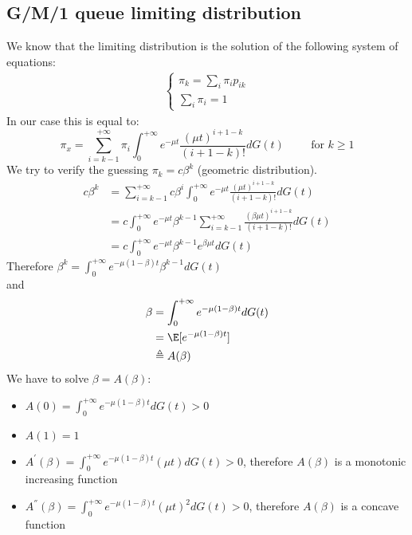 \subsection{G/M/1 queue limiting distribution}
We know that the limiting distribution is the solution of the following system of equations:
\begin{equation*}
 \begin{split}
	 \begin{cases}
		 \pi_k = \sum_i \pi_i p_{ik} \\
		 \sum_i \pi_i = 1
	 \end{cases}
 \end{split}
\end{equation*}
In our case this is equal to:
$$\pi_x = \sum_{i = k-1}^{+\infty} \pi_i \int_0^{+\infty}e^{-\mu t} \frac{(\mu t)^{i+1-k}}{(i+1-k)!}dG(t) \hspace{1cm} \text{for } k \geq 1$$
We try to verify the guessing $\pi_k=c\beta^k$ (geometric distribution).
\begin{equation*}
 \begin{split}
		 c\beta^k &= \sum_{i = k-1}^{+\infty} c\beta^i \int_0^{+\infty}e^{-\mu t} \frac{(\mu t)^{i+1-k}}{(i+1-k)!}dG(t) \\
		 &= c \int_0^{+\infty}e^{-\mu t}\beta^{k-1}\sum_{i = k-1}^{+\infty}\frac{(\beta \mu t)^{i+1-k}}{(i+1-k)!}dG(t) \\
		 &= c \int_0^{+\infty}e^{-\mu t}\beta^{k-1}e^{\beta \mu t}dG(t)
 \end{split}
\end{equation*}
Therefore $\beta^k = \int_0^{+\infty}e^{-\mu(1-\beta)t}\beta^{k-1}dG(t)$\\
and
\begin{equation*}
 \begin{split}
		  \beta &= \int_0^{+\infty}e^{-\mu(1-\beta)t}dG(t)\\
			&= \E[e^{-\mu(1-\beta)t}]\\
			&\triangleq A(\beta)
 \end{split}
\end{equation*}
We have to solve $\beta = A(\beta)$:
\begin{itemize}
	\item $A(0) = \int_0^{+\infty}e^{-\mu(1-\beta)t}dG(t) > 0$
	\item $A(1) = 1 $
	\item $A^{'}(\beta)=\int_0^{+\infty}e^{-\mu(1-\beta)t}(\mu t)dG(t) > 0$, therefore $A(\beta)$ is a monotonic increasing function
	\item $A^{''}(\beta)=\int_0^{+\infty}e^{-\mu(1-\beta)t}(\mu t)^2dG(t) > 0$, therefore $A(\beta)$ is a concave function
\end{itemize}
